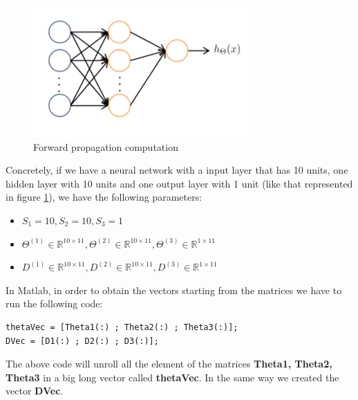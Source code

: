 \begin{figure}
\begin{center}
\includegraphics[scale=0.35]{images/nnunrollex}
\end{center}
\caption{Forward propagation computation } 
\label{fig:nnunrollex}
\end{figure}

Concretely, if we have a neural network with a input layer that has 10 units, one hidden layer with 10 units and one output layer with 1 unit (like that represented in figure \ref{fig:nnunrollex}), we have the following parameters:

\begin{itemize}
\item $S_1 = 10, S_2 = 10, S_3 = 1$\\
\item $\Theta^{(1)} \in  \mathbb{R}^{10 \times 11}, \Theta^{(2)} \in  \mathbb{R}^{10 \times 11}, \Theta^{(3)} \in  \mathbb{R}^{1 \times 11}$\\
\item $D^{(1)} \in  \mathbb{R}^{10 \times 11}, D^{(2)} \in  \mathbb{R}^{10 \times 11}, D^{(3)} \in  \mathbb{R}^{1 \times 11}$\\
\end{itemize}

In Matlab, in order to obtain the vectors starting from the matrices we have to run the following code:

\begin{mdframed}[style=MyFrame]
\begin{lstlisting}
thetaVec = [Theta1(:) ; Theta2(:) ; Theta3(:)];
DVec = [D1(:) ; D2(:) ; D3(:)];
\end{lstlisting}
\end{mdframed}

The above code will unroll all the element of the matrices {\bf Theta1, Theta2, Theta3} in a big long vector called {\bf thetaVec}. In the same way we created the vector {\bf DVec}.

